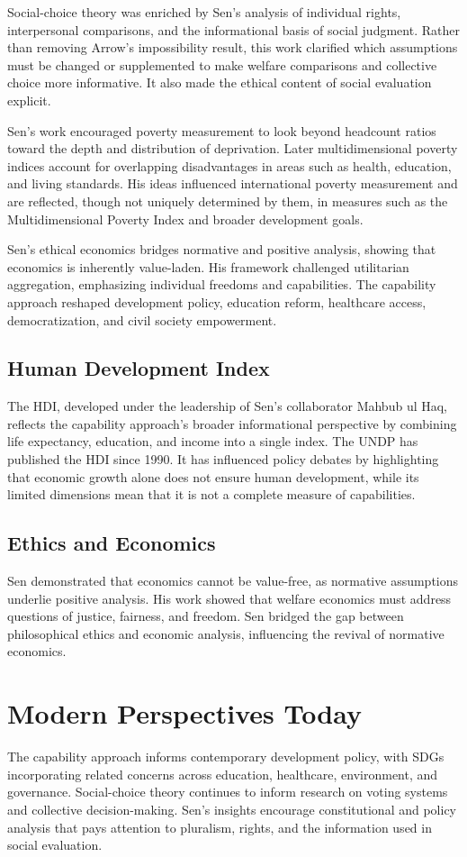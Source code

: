 Social-choice theory was enriched by Sen's analysis of individual rights,
interpersonal comparisons, and the informational basis of social judgment. Rather
than removing Arrow's impossibility result, this work clarified which assumptions
must be changed or supplemented to make welfare comparisons and collective choice
more informative. It also made the ethical content of social evaluation explicit.

Sen's work encouraged poverty measurement to look beyond headcount ratios toward
the depth and distribution of deprivation. Later multidimensional poverty indices
account for overlapping disadvantages in areas such as health, education, and
living standards. His ideas influenced international poverty measurement and are
reflected, though not uniquely determined by them, in measures such as the
Multidimensional Poverty Index and broader development goals.

Sen's ethical economics bridges normative and positive analysis, showing that
economics is inherently value-laden. His framework challenged utilitarian
aggregation, emphasizing individual freedoms and capabilities. The capability
approach reshaped development policy, education reform, healthcare access,
democratization, and civil society empowerment.

\subsection*{Human Development Index}
The HDI, developed under the leadership of Sen's collaborator Mahbub ul Haq,
reflects the capability approach's broader informational perspective by combining
life expectancy, education, and income into a single index. The UNDP has published
the HDI since 1990. It has influenced policy debates by highlighting that economic
growth alone does not ensure human development, while its limited dimensions mean
that it is not a complete measure of capabilities.

\subsection*{Ethics and Economics}
Sen demonstrated that economics cannot be value-free, as normative assumptions
underlie positive analysis. His work showed that welfare economics must address
questions of justice, fairness, and freedom. Sen bridged the gap between
philosophical ethics and economic analysis, influencing the revival of normative
economics.

\section{Modern Perspectives Today}
The capability approach informs contemporary development policy, with SDGs
incorporating related concerns across education, healthcare, environment, and
governance. Social-choice theory continues to inform research on voting systems
and collective decision-making. Sen's insights encourage constitutional and policy
analysis that pays attention to pluralism, rights, and the information used in
social evaluation.

